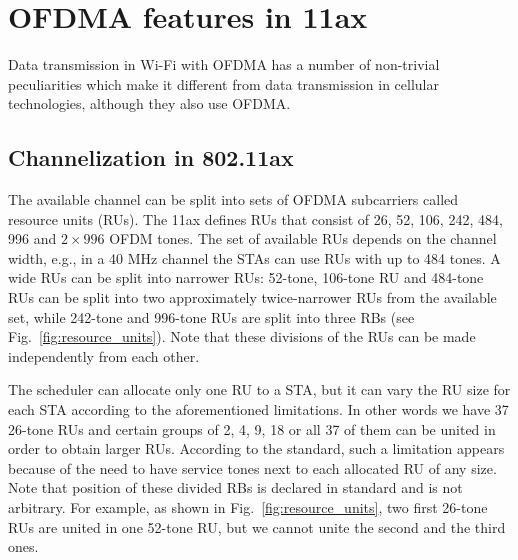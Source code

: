\section{OFDMA features in 11ax}
\label{sec:features}

Data transmission in Wi-Fi with OFDMA has a number of non-trivial peculiarities which make it different from data transmission in cellular technologies, although they also use OFDMA.

\subsection{Channelization in 802.11ax}
The available channel can be split into sets of OFDMA subcarriers called resource units (RUs).
The 11ax defines RUs that consist of 26, 52, 106, 242, 484, 996 and $2\times996$ OFDM tones.
The set of available RUs depends on the channel width, e.g., in a 40 MHz channel the STAs can use RUs with up to 484 tones.
A wide RUs can be split into narrower RUs: 52-tone, 106-tone RU and 484-tone RUs can be split into two approximately twice-narrower RUs from the available set, while 242-tone and 996-tone RUs are split into three RBs (see Fig.~\ref{fig:resource_units}).
Note that these divisions of the RUs can be made independently from each other. 

The scheduler can allocate only one RU to a STA, but it can vary the RU size for each STA according to the aforementioned limitations.
In other words we have 37 26-tone RUs and certain groups of 2, 4, 9, 18 or all 37 of them can be united in order to obtain larger RUs.
According to the standard, such a limitation appears because of the need to have service tones next to each allocated RU of any size. 
Note that position of these divided RBs is declared in standard and is not arbitrary.
For example, as shown in Fig.~\ref{fig:resource_units}, two first 26-tone RUs are united in one 52-tone RU, but we cannot unite the second and the third ones.



